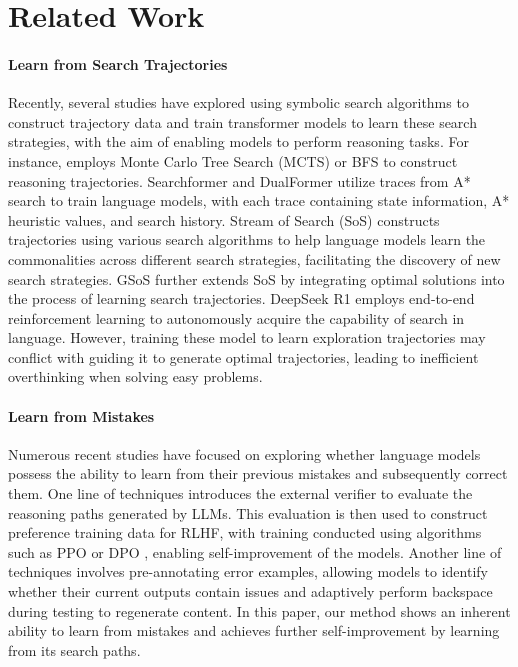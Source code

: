 \documentclass{article}
\theoremstyle{plain}
\theoremstyle{definition}
\theoremstyle{remark}
\begin{document}
\section{Related Work}
\paragraph{Learn from Search Trajectories}
Recently, several studies have explored using symbolic search algorithms to construct trajectory data and train transformer models to learn these search strategies, with the aim of enabling models to perform reasoning tasks. For instance, \citet{yang2022chain} employs Monte Carlo Tree Search (MCTS) or BFS to construct reasoning trajectories. Searchformer \cite{searchformer} and DualFormer \cite{dualformer} utilize traces from A* search to train language models, with each trace containing state information, A* heuristic values, and search history. Stream of Search (SoS) \cite{sos} constructs trajectories using various search algorithms to help language models learn the commonalities across different search strategies, facilitating the discovery of new search strategies. GSoS \cite{gsos} further extends SoS by integrating optimal solutions into the process of learning search trajectories.
 DeepSeek R1 \cite{guo2025deepseek} employs end-to-end reinforcement learning to autonomously acquire the capability of search in language. However, training these model to learn exploration trajectories may conflict with guiding it to generate optimal trajectories, leading to inefficient overthinking when solving easy problems.

\paragraph{Learn from Mistakes}
Numerous recent studies have focused on exploring whether language models possess the ability to learn from their previous mistakes and subsequently correct them. One line of techniques \cite{an2023learning,tong2024can,cpo} introduces the external verifier to evaluate the reasoning paths generated by LLMs. This evaluation is then used to construct preference training data for RLHF, with training conducted using algorithms such as PPO \cite{ppo} or DPO \cite{dpo}, enabling self-improvement \cite{yuan2024self} of the models. Another line of techniques \cite{cundy2023sequencematch,zhang2024backtracking,ye2024physics} involves pre-annotating error examples, allowing models to identify whether their current outputs contain issues and adaptively perform backspace during testing to regenerate content. In this paper, our method shows an inherent ability to learn from mistakes and achieves further self-improvement by learning from its search paths.
\end{document}
